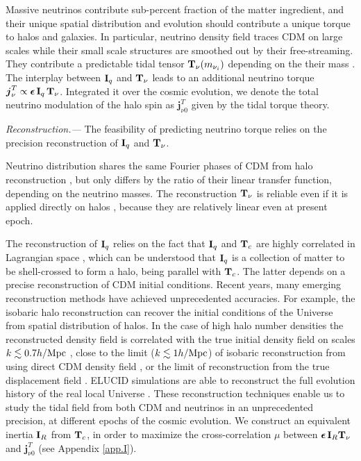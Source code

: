 \documentclass[aps,prd,twocolumn,amsmath,amssymb,amsfont,superscriptaddress,nofootinbib]{revtex4-1}
\newcommand{\bs}{\boldsymbol}
\newcommand{\diff}{{\mathrm d}}
\newcommand{\T}{\bold{T}}
\newcommand{\I}{\bold{I}}
\newcommand{\spin}{\bs{j}}
\begin{document}
Massive neutrinos contribute sub-percent fraction of the matter ingredient, and their unique spatial distribution and evolution should contribute a unique torque to halos and galaxies.
In particular, neutrino density field traces CDM on large scales while their small scale structures are smoothed out by their free-streaming. 
They contribute a predictable tidal tensor $\T_\nu(m_{\nu_i})$ depending on the their mass \citep{2015PhRvD..92b3502I}. 
The interplay between $\I_q$ and $\T_\nu$ leads to an additional neutrino torque $\spin^T_\nu\propto\bs{\epsilon}\,\I_q\,\T_\nu$.
Integrated it over the cosmic evolution, we denote the total neutrino modulation of the halo spin as $\spin^T_{\nu 0}$ given by the tidal torque theory.





\textit{Reconstruction.---}
The feasibility of predicting neutrino torque relies on the precision reconstruction of $\I_q$ and $\T_\nu$.

Neutrino distribution shares the same Fourier phases of CDM from halo reconstruction \citep{2015PhRvD..92b3502I,2017ApJ...847..110Y}, but only differs by the ratio of their linear transfer function, depending on the neutrino masses. The reconstruction $\T_\nu$ is reliable even if it is applied directly on halos \citep{2015PhRvD..92b3502I}, because they are relatively linear even at present epoch.

The reconstruction of $\I_q$ relies on the fact that $\I_q$ and $\T_c$ are highly correlated in Lagrangian space \citep{2000ApJ...532L...5L,2001ApJ...555..106L},
which can be understood that $\I_q$ is a collection of matter to be shell-crossed to form a halo, being parallel with $\T_c$.
The latter depends on a precise reconstruction of CDM initial conditions. 
Recent years, many emerging reconstruction methods have achieved unprecedented accuracies.
For example, the isobaric halo reconstruction \citep{2017PhRvD..96l3502Z} can recover the initial conditions of the Universe from spatial distribution of halos.
In the case of high halo number densities the reconstructed density field is correlated with the true initial density field on scales $k\lesssim 0.7 h/{\rm Mpc}$ \citep{2017ApJ...847..110Y}, 
close to the limit ($k\lesssim 1 h/{\rm Mpc}$) of isobaric reconstruction from using direct CDM density field \citep{2017MNRAS.469.1968P}, 
or the limit of reconstruction from the true displacement field \citep{2017PhRvD..95d3501Y}. 
ELUCID simulations are able to reconstruct the full evolution history of the real local Universe \citep{2014ApJ...794...94W}. These reconstruction techniques enable us to study the tidal field from both CDM and neutrinos in an unprecedented precision, at different epochs of the cosmic evolution. We construct an equivalent inertia $\I_R$ from $\T_c$, in order to maximize the cross-correlation $\mu$ between $\bs{\epsilon}\,\I_R\T_\nu$ and $\spin^T_{\nu 0}$ (see Appendix \ref{app.I}).
\end{document}
